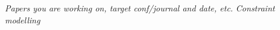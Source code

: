 \indent \textit{Papers you are working on, target conf/journal and date, etc.}
\textit{Constraint modelling }